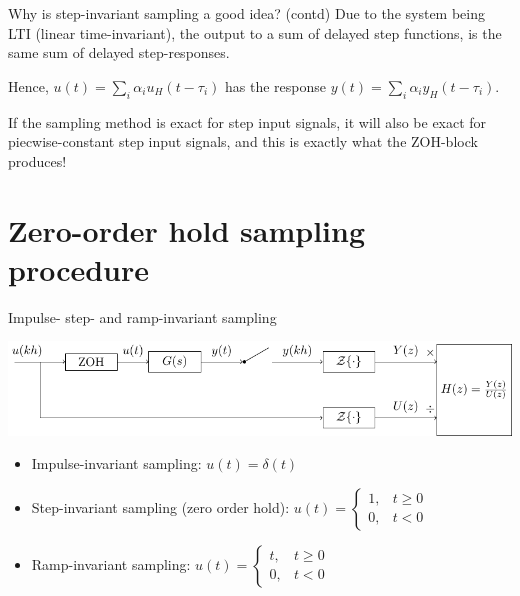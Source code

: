 \documentclass[presentation,aspectratio=169]{beamer}
\begin{document}
\begin{frame}[label={sec:org0bda2ea}]{Why is step-invariant sampling a good idea? (contd)}
Due to the system being LTI (linear time-invariant), the output to a sum of delayed step functions, is the same sum of delayed step-responses.

\begin{LaTeX}
\begin{center}
\end{center}
\end{LaTeX}
Hence, \(u(t) = \sum_{i} \alpha_i u_H(t-\tau_i)\) has the response \(y(t) = \sum_i \alpha_i y_H(t-\tau_i)\). 

\alert{If the sampling method is exact for step input signals, it will also be exact for piecwise-constant step input signals, and this is exactly what the ZOH-block produces!}
\end{frame}

\section{Zero-order hold sampling procedure}
\label{sec:org14970b5}
\begin{frame}[label={sec:org22b73b4}]{Impulse- step- and ramp-invariant sampling}
\begin{center}
\includegraphics[width=0.9\linewidth]{../../figures/invariant-sampling.pdf}
\end{center}

\begin{itemize}
\item Impulse-invariant sampling: \(u(t) = \delta(t)\)
\item Step-invariant sampling (zero order hold): \(u(t) = \begin{cases} 1, & t \ge 0\\0, & t<0 \end{cases}\)
\item Ramp-invariant sampling: \(u(t) = \begin{cases} t, & t \ge 0\\0, & t<0 \end{cases}\)
\end{itemize}
\end{frame}
\end{document}
